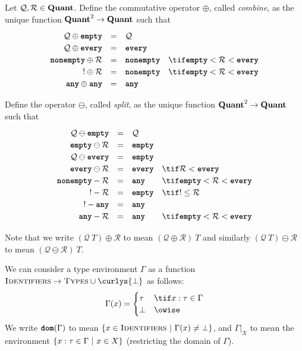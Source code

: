 \documentclass[10pt]{article}
\begin{document}
\begin{definition}
    Let $\mathcal{Q}, \mathcal{R} \in \textbf{Quant}$.
    Define the commutative operator $\oplus$, called \emph{combine}, as the unique function $\textbf{Quant}^2 \to \textbf{Quant}$ such that
    \[
        \renewcommand\arraystretch{1.2}
        \begin{array}{r c l l l}
            \mathcal{Q} \oplus \emptyq & = & \mathcal{Q} & \\
            \mathcal{Q} \oplus \every & = & \every & \\
            \nonempty \oplus \mathcal{R} & = & \nonempty & \tif \emptyq < \mathcal{R} < \every \\
            \exactlyone \oplus \mathcal{R} & = & \nonempty & \tif \emptyq < \mathcal{R} < \every \\
            \any \oplus \any & = & \any &
        \end{array}
    \]

    Define the operator $\ominus$, called \emph{split}, as the unique function $\textbf{Quant}^2 \to \textbf{Quant}$ such that
    \[
        \renewcommand\arraystretch{1.2}
        \begin{array}{r c l l l}
            \mathcal{Q} \ominus \emptyq & = & \mathcal{Q} & \\
            \emptyq \ominus \mathcal{R} & = & \emptyq & \\
            \mathcal{Q} \ominus \every &= & \emptyq & \\
            \every \ominus \mathcal{R} &= & \every & \tif \mathcal{R} < \every \\
            \nonempty - \mathcal{R} &= & \any & \tif \emptyq < \mathcal{R} < \every \\
            \exactlyone - \mathcal{R} &= & \emptyq & \tif \exactlyone \leq \mathcal{R} \\
            \exactlyone - \any &= & \any & \\
            \any - \mathcal{R} &= & \any & \tif \emptyq < \mathcal{R} < \every \\
        \end{array}
    \]
\end{definition}

Note that we write $(\mathcal{Q}~T) \oplus \mathcal{R}$ to mean $(\mathcal{Q} \oplus \mathcal{R})~T$ and similarly $(\mathcal{Q}~T) \ominus \mathcal{R}$ to mean $(\mathcal{Q} \ominus \mathcal{R})~T$.

\begin{definition}
    We can consider a type environment $\Gamma$ as a function $\textsc{Identifiers}\xspace \to \textsc{Types}\xspace \cup \curlys{\bot}$ as follows:
    \[
        \Gamma(x) =
        \begin{cases}
            \tau & \tif x : \tau \in \Gamma \\
            \bot & \owise
        \end{cases}
    \]
    We write $\textbf{\texttt{dom}}(\Gamma)$ to mean $\left\{ {x \in \textsc{Identifiers}} ~|~ {\Gamma(x) \neq \bot} \right\}$, and $\Gamma|_X$ to mean the environment $\left\{ {x : \tau \in \Gamma} ~|~ {x \in X} \right\}$ (restricting the domain of $\Gamma$).
\end{definition}
\end{document}
